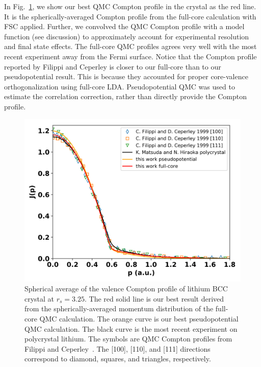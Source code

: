 \documentclass[aps,prb,showpacs,preprintnumbers,amsmath,amssymb,superscriptaddress,twocolumn]{revtex4}
\begin{document}
In Fig.~\ref{fig:crystal-vcp}, we show our best QMC Compton profile in the crystal as the red line. It is the spherically-averaged Compton profile from the full-core calculation with FSC applied. Further, we convolved the QMC Compton profile with a model function (see discussion) to approximately account for experimental resolution and final state effects. The full-core QMC profiles agrees very well with the most recent experiment away from the Fermi surface.
Notice that the Compton profile reported by Filippi and Ceperley \cite{Filippi1999} is closer to our full-core than to our pseudopotential result. This is because they accounted for proper core-valence orthogonalization using full-core LDA. Pseudopotential QMC was used to estimate the correlation correction, rather than directly provide the Compton profile.

\begin{figure}
\includegraphics[scale=0.48]{figures/li40_fc7-vcp}
\caption{Spherical average of the valence Compton profile of lithium BCC crystal at $r_s=3.25$. The red solid line is our best result derived from the spherically-averaged momentum distribution of the full-core QMC calculation. The orange curve is our best pseudopotential QMC calculation. The black curve is the most recent experiment on polycrystal lithium. The symbols are QMC Compton profiles from Filippi and Ceperley~\cite{Filippi1999}. The [100], [110], and [111] directions correspond to diamond, squares, and triangles, respectively.\label{fig:crystal-vcp}}
\end{figure}
\end{document}
